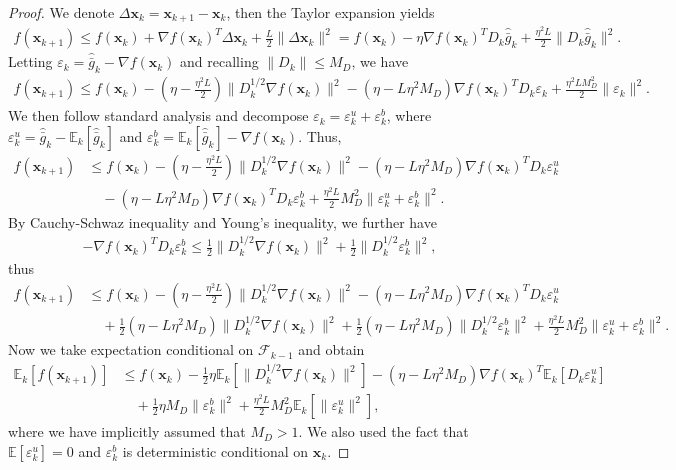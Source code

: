 \documentclass{article}
\newcommand{\bx}{\boldsymbol{x}}
\newcommand{\barg}{\bar{g}}
\theoremstyle{plain}
\theoremstyle{definition}
\theoremstyle{remark}
\begin{document}
\begin{proof}
We denote $\Delta\bx_k = \bx_{k+1}-\bx_k$, then 
the Taylor expansion yields
\begin{align*}
    f(\bx_{k+1})  \le f(\bx_k) + \nabla f(\bx_k)^T \Delta \bx_k + \frac{L }{2} \|\Delta \bx_k\|^2  = f(\bx_k) - \eta  \nabla f(\bx_k)^T D_k\widehat{\barg}_k + \frac{\eta^2 L }{2} \|D_k\widehat{\barg}_k\|^2.
\end{align*}
Letting $\varepsilon_k = \widehat{\barg}_k - \nabla f(\bx_k)$ and recalling $\|D_k\|\leq M_D$, we have
\begin{align*}
    f(\bx_{k+1}) \le f(\bx_k) - \left(\eta-\frac{\eta^2 L }{2} \right) \| D_k^{1/2}\nabla f(\bx_k)\|^2  - (\eta - L \eta^2 M_D) \nabla f(\bx_k)^T D_k \varepsilon_k  + \frac{\eta^2 L M_D^2}{2}  \|\varepsilon_k\|^2.
\end{align*}
We then follow standard analysis and decompose $\varepsilon_k = \varepsilon_k^u+\varepsilon_k^b$, where $\varepsilon_k^u=\widehat{\barg}_k-\mathbb{E}_k[\widehat{\barg}_k]$ and $\varepsilon_k^b=\mathbb{E}_k[\widehat{\barg}_k]-\nabla f(\bx_k)$. Thus,
\begin{align*}
    f(\bx_{k+1}) & \le f(\bx_k) - \left(\eta-\frac{\eta^2 L }{2} \right) \| D_k^{1/2}\nabla f(\bx_k)\|^2  - (\eta - L \eta^2 M_D) \nabla f(\bx_k)^T D_k \varepsilon_k^u \\
    & \quad - (\eta - L \eta^2 M_D) \nabla f(\bx_k)^T D_k \varepsilon_k^b  + \frac{\eta^2 L }{2} M_D^2 \|\varepsilon_k^u+\varepsilon_k^b\|^2.
\end{align*}
By Cauchy-Schwaz inequality and Young's inequality, we further have
\begin{align*}
   -  \nabla f(\bx_k)^T D_k \varepsilon_k^b \leq \frac{1}{2}\|D_k^{1/2}\nabla f(\bx_k)\|^2 + \frac{1}{2}\|D_k^{1/2} \varepsilon_k^b\|^2, 
\end{align*}
thus
\begin{align*}
    f(\bx_{k+1}) & \le f(\bx_k) - \left(\eta-\frac{\eta^2 L }{2} \right) \| D_k^{1/2}\nabla f(\bx_k)\|^2  - (\eta - L \eta^2 M_D) \nabla f(\bx_k)^T D_k \varepsilon_k^u \\
    & \quad + \frac{1}{2} (\eta - L \eta^2 M_D) \|D_k^{1/2}\nabla f(\bx_k)\|^2 + \frac{1}{2}(\eta - L \eta^2 M_D) \|D_k^{1/2} \varepsilon_k^b\|^2 + \frac{\eta^2 L }{2} M_D^2 \|\varepsilon_k^u+\varepsilon_k^b\|^2.
\end{align*}
Now we take expectation conditional on $\mathcal{F}_{k-1}$ and obtain
\begin{align*}
    \mathbb{E}_k[ f(\bx_{k+1}) ] & \le f(\bx_k) - \frac{1}{2} \eta \mathbb{E}_k[ \| D_k^{1/2}\nabla f(\bx_k)\|^2 ] - (\eta - L \eta^2 M_D) \nabla f(\bx_k)^T \mathbb{E}_k[ D_k \varepsilon_k^u] \\
    & \quad + \frac{1}{2}\eta M_D  \|\varepsilon_k^b\|^2  + \frac{\eta^2 L }{2} M_D^2 \mathbb{E}_k[ \|\varepsilon_k^u\|^2],
\end{align*}
where we have implicitly assumed that $M_D>1$. We also used the fact that $\mathbb{E}[\varepsilon_k^u]=0$ and $\varepsilon_k^b$ is deterministic conditional on $\bx_k$.

\end{proof}
\end{document}
